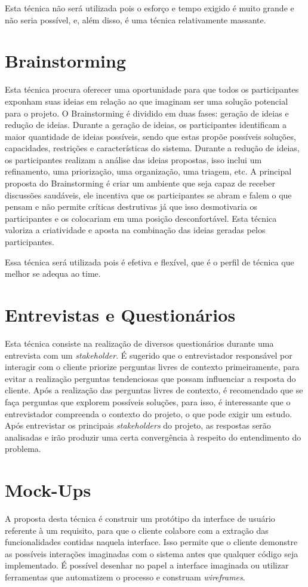 Esta técnica não será utilizada pois o esforço e tempo exigido é muito grande e não seria possível, e, além disso, é uma técnica relativamente massante.

\section{Brainstorming}
Esta técnica procura oferecer uma oportunidade para que todos os participantes exponham suas ideias em relação ao que imaginam ser uma solução potencial para o projeto. O Brainstorming é dividido em duas fases: geração de ideias e redução de ideias. Durante a geração de ideias, os participantes identificam a maior quantidade de ideias possíveis, sendo que estas propõe possíveis soluções, capacidades, restrições e características do sistema. Durante a redução de ideias, os participantes realizam a análise das ideias propostas, isso inclui um refinamento, uma priorização, uma organização, uma triagem, etc.
A principal proposta do Brainstorming é criar um ambiente que seja capaz de receber discussões saudáveis, ele incentiva que os participantes se abram e falem o que pensam e não permite críticas destrutivas já que isso desmotivaria os participantes e os colocariam em uma posição desconfortável. Esta técnica valoriza a criatividade e aposta na combinação das ideias geradas pelos participantes.

Essa técnica será utilizada pois é efetiva e flexível, que é o perfil de técnica que melhor se adequa ao time.

\section{Entrevistas e Questionários}
Esta técnica consiste na realização de diversos questionários durante uma entrevista com um \emph{stakeholder}. É sugerido que o entrevistador responsável por interagir com o cliente priorize perguntas livres de contexto primeiramente, para evitar a realização perguntas tendenciosas que possam influenciar a resposta do cliente. Após a realização das perguntas livres de contexto, é recomendado que se faça perguntas que explorem possíveis soluções, para isso, é interessante que o entrevistador compreenda o contexto do projeto, o que pode exigir um estudo.
Após entrevistar os principais \emph{stakeholders} do projeto, as respostas serão analisadas e irão produzir uma certa convergência à respeito do entendimento do problema.

\section{Mock-Ups}
A proposta desta técnica é construir um protótipo da interface de usuário referente à um requisito, para que o cliente colabore com a extração das funcionalidades contidas naquela interface. Isso permite que o cliente demonstre as possíveis interações imaginadas com o sistema antes que qualquer código seja implementado. É possível desenhar no papel a interface imaginada ou utilizar ferramentas que automatizem o processo e construam \emph{wireframes}.

